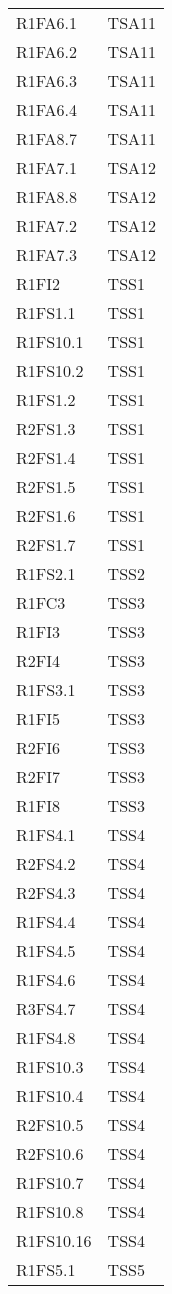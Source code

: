 {\begin{longtable}{C{4cm} C{4cm}}
R1FA6.1 & TSA11  \\
R1FA6.2 & TSA11  \\
R1FA6.3 & TSA11  \\
R1FA6.4 & TSA11  \\
R1FA8.7 & TSA11  \\

R1FA7.1 & TSA12  \\
R1FA8.8 & TSA12  \\
R1FA7.2 & TSA12  \\
R1FA7.3 & TSA12  \\

R1FI2 & TSS1 \\
R1FS1.1 & TSS1 \\
R1FS10.1 & TSS1 \\
R1FS10.2 & TSS1 \\
R1FS1.2 & TSS1 \\
R2FS1.3 & TSS1 \\
R2FS1.4 & TSS1 \\
R2FS1.5 & TSS1 \\
R2FS1.6 & TSS1 \\
R2FS1.7 & TSS1 \\
R1FS2.1 & TSS2 \\
R1FC3 & TSS3 \\
R1FI3 & TSS3 \\
R2FI4 & TSS3 \\
R1FS3.1 & TSS3 \\
R1FI5 & TSS3 \\
R2FI6 & TSS3 \\
R2FI7 & TSS3 \\
R1FI8 & TSS3 \\
R1FS4.1 & TSS4 \\
R2FS4.2 & TSS4 \\
R2FS4.3 & TSS4 \\
R1FS4.4 & TSS4 \\
R1FS4.5 & TSS4 \\
R1FS4.6 & TSS4 \\
R3FS4.7 & TSS4 \\
R1FS4.8 & TSS4 \\
R1FS10.3 & TSS4 \\
R1FS10.4 & TSS4 \\
R2FS10.5 & TSS4 \\
R2FS10.6 & TSS4 \\
R1FS10.7 & TSS4 \\
R1FS10.8 & TSS4 \\
R1FS10.16 & TSS4 \\
R1FS5.1 & TSS5 \\

\end{longtable}}
